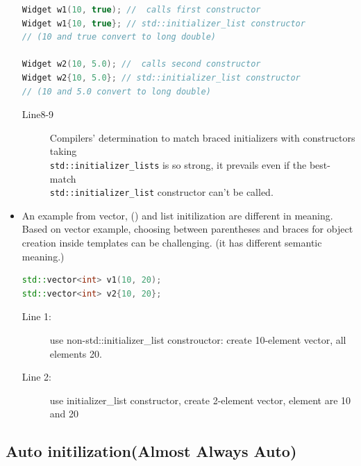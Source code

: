 \documentclass[a4paper,11pt,twoside]{book}
\begin{document}
\begin{itemize}
\begin{lstlisting}[frame=single, language=c++,mathescape=true]
Widget w1(10, true); //  calls first constructor
Widget w1{10, true}; // std::initializer_list constructor
// (10 and true convert to long double)

Widget w2(10, 5.0); //  calls second constructor
Widget w2{10, 5.0}; // std::initializer_list constructor
// (10 and 5.0 convert to long double)
\end{lstlisting}
\begin{description}
    \item[Line8-9] Compilers' determination to match braced initializers with constructors taking \\ \texttt{std::initializer\_lists} is so strong, it prevails even if the best-match \\ \texttt{std::initializer\_list} constructor can't be called.
\end{description}
	
	\item An example from vector, () and list initilization are different in meaning. Based on vector example, choosing between parentheses and braces for object creation inside templates can be challenging. (it has different semantic meaning.)
	
\begin{lstlisting}[frame=single, language=c++,mathescape=true]
std::vector<int> v1(10, 20); 
std::vector<int> v2{10, 20}; 
\end{lstlisting}
\begin{description}
	\item[Line 1:] use non-std::initializer\_list constrouctor: create 10-element vector, all elements 20.
	\item[Line 2:] use initializer\_list constructor, create 2-element vector, element are 10 and 20
\end{description}
	
	
	
	
\end{itemize}

\subsection{Auto initilization(Almost Always Auto)}
\end{document}
